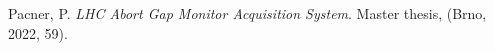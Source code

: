 {\begin{thebibliography}{99}
        Pacner, P. \emph{LHC Abort Gap Monitor
            Acquisition System}. Master thesis, (Brno, 2022, 59).




% 

    \end{thebibliography}
} %
